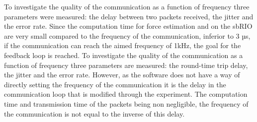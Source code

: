 {\color{green}
To investigate the quality of the communication as a function of frequency three parameters were measured: the delay between two packets received, the jitter and the error rate. Since the computation time for force estimation and on the sbRIO are very small compared to the frequency of the communication, inferior to 3 µs, if the communication can reach the aimed frequency of 1kHz, the goal for the feedback loop is reached.
}
{\color{red}
To investigate the quality of the communication as a function of frequency three parameters are measured: the round-time trip delay, the jitter and the error rate. However, as the software does not have a way of directly setting the frequency of the communication it is the delay in the communication loop that is modified through the experiment. The computation time and transmission time of the packets being non negligible, the frequency of the communication is not equal to the inverse of this delay.
}
